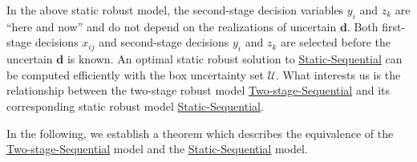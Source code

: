 \documentclass[preprint,review,10pt,round,authoryear]{elsarticle}\usepackage[]{graphicx}\usepackage[]{color}
\theoremstyle{plain}
\theoremstyle{definition}
\theoremstyle{remark}
\begin{document}
In the above static robust model, the second-stage decision variables $y_i$ and $z_k$ are ``here and now'' and do not depend on the realizations of uncertain $\mathbf{d}$. Both first-stage decisions $x_{ij}$ and second-stage decisions $y_i$ and $z_k$ are selected before the uncertain $\mathbf{d}$ is known. An optimal static robust solution to \hyperref[sro:1]{Static-Sequential} can be computed efficiently with the box uncertainty set $\mathcal{U}$. What interests us is the relationship between the two-stage robust model \hyperref[2ro:1]{Two-stage-Sequential} and its corresponding static robust model \hyperref[sro:1]{Static-Sequential}. 

In the following, we establish a theorem which describes the equivalence of the \hyperref[2ro:1]{Two-stage-Sequential} model and the \hyperref[sro:1]{Static-Sequential} model.
  
\end{document}
